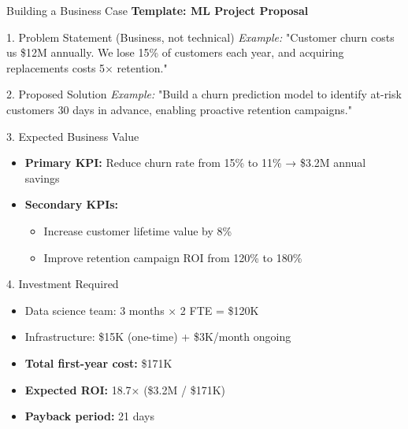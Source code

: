 \begin{frame}[fragile]{Building a Business Case}
\textbf{Template: ML Project Proposal}

\begin{block}{1. Problem Statement (Business, not technical)}
\textit{Example:} "Customer churn costs us \$12M annually. We lose 15\% of customers each year, and acquiring replacements costs 5× retention."
\end{block}

\begin{block}{2. Proposed Solution}
\textit{Example:} "Build a churn prediction model to identify at-risk customers 30 days in advance, enabling proactive retention campaigns."
\end{block}

\begin{block}{3. Expected Business Value}
\begin{itemize}
\item \textbf{Primary KPI:} Reduce churn rate from 15\% to 11\% → \$3.2M annual savings
\item \textbf{Secondary KPIs:}
  \begin{itemize}
  \item Increase customer lifetime value by 8\%
  \item Improve retention campaign ROI from 120\% to 180\%
  \end{itemize}
\end{itemize}
\end{block}

\begin{block}{4. Investment Required}
\begin{itemize}
\item Data science team: 3 months × 2 FTE = \$120K
\item Infrastructure: \$15K (one-time) + \$3K/month ongoing
\item \textbf{Total first-year cost:} \$171K
\item \textbf{Expected ROI:} 18.7× (\$3.2M / \$171K)
\item \textbf{Payback period:} 21 days
\end{itemize}
\end{block}
\end{frame}

